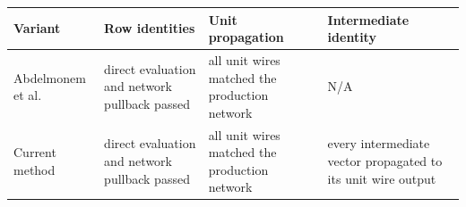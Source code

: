 \begin{tabular}{llll}
\hline
Variant & Row identities & Unit propagation & Intermediate identity \\
\hline
Abdelmonem et al. & direct evaluation and network pullback passed & all unit wires matched the production network & N/A \\
Current method & direct evaluation and network pullback passed & all unit wires matched the production network & every intermediate vector propagated to its unit wire output \\
\hline
\end{tabular}
